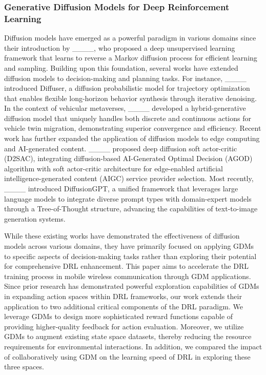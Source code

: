 \subsubsection{Generative Diffusion Models for Deep Reinforcement Learning}
Diffusion models have emerged as a powerful paradigm in various domains since their introduction by ____, who proposed a deep unsupervised learning framework that learns to reverse a Markov diffusion process for efficient learning and sampling. Building upon this foundation, several works have extended diffusion models to decision-making and planning tasks. For instance, ____ introduced Diffuser, a diffusion probabilistic model for trajectory optimization that enables flexible long-horizon behavior synthesis through iterative denoising. In the context of vehicular metaverses, ____ developed a hybrid-generative diffusion model that uniquely handles both discrete and continuous actions for vehicle twin migration, demonstrating superior convergence and efficiency. Recent work has further expanded the application of diffusion models to edge computing and AI-generated content. ____ proposed deep diffusion soft actor-critic (D2SAC), integrating diffusion-based AI-Generated Optimal Decision (AGOD) algorithm with soft actor-critic architecture for edge-enabled artificial intelligence-generated content (AIGC) service provider selection. Most recently, ____ introduced DiffusionGPT, a unified framework that leverages large language models to integrate diverse prompt types with domain-expert models through a Tree-of-Thought structure, advancing the capabilities of text-to-image generation systems. 



While these existing works have demonstrated the effectiveness of diffusion models across various domains, they have primarily focused on applying GDMs to specific aspects of decision-making tasks rather than exploring their potential for comprehensive DRL enhancement. This paper aims to accelerate the DRL training process in mobile wireless communication through GDM applications. Since prior research has demonstrated powerful exploration capabilities of GDMs in expanding action spaces within DRL frameworks, our work extends their application to two additional critical components of the DRL paradigm. We leverage GDMs to design more sophisticated reward functions capable of providing higher-quality feedback for action evaluation. Moreover, we utilize GDMs to augment existing state space datasets, thereby reducing the resource requirements for environmental interactions. In addition, we compared the impact of collaboratively using GDM on the learning speed of DRL in exploring these three spaces.





